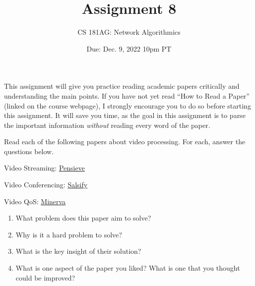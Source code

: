 \documentclass[10pt]{article}
\date{Due: Dec. 9, 2022 10pm PT}
\newenvironment{problem}[2][Problem]{\begin{trivlist}
\item[\hskip \labelsep {\bfseries #1}\hskip \labelsep {\bfseries #2.}]}{\end{trivlist}}
\begin{document}
 
\title{Assignment 8}
\author{
CS 181AG: Network Algorithmics}
\maketitle

This assignment will give you practice reading academic papers critically and understanding the main points. If you have not yet read ``How to Read a Paper'' (linked on the course webpage), I strongly encourage you to do so before starting this assignment. It will save you time, as the goal in this assignment is to parse the important information \emph{without} reading every word of the paper. 

\begin{problem}{1: Reading}
Read each of the following papers about video processing. For each, answer the questions below.

Video Streaming: \href{https://web.mit.edu/pensieve/content/pensieve-sigcomm17.pdf}{Pensieve}

Video Conferencing: \href{https://www.usenix.org/system/files/conference/nsdi18/nsdi18-fouladi.pdf}{Salsify}

Video QoS: \href{https://people.csail.mit.edu/vibhaa/files/minerva.pdf}{Minerva}

\begin{enumerate}
    \item What problem does this paper aim to solve?
    \item Why is it a hard problem to solve?
    \item What is the key insight of their solution? 
    \item What is one aspect of the paper you liked? What is one that you thought could be improved?
\end{enumerate}
\end{problem}
\end{document}
